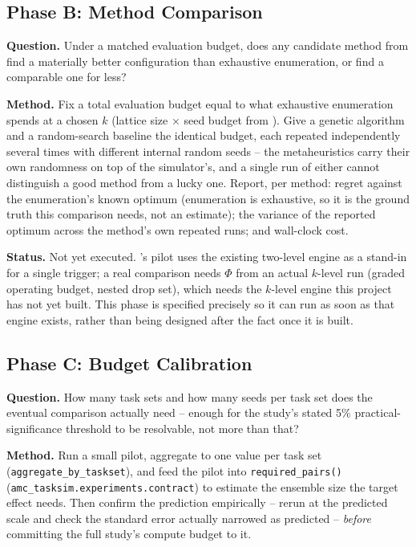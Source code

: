 \documentclass{article}
\begin{document}
\subsection{Phase B: Method Comparison}
\label{sec:phase-b}

\textbf{Question.} Under a matched evaluation budget, does any candidate
method from  find a materially better configuration
than exhaustive enumeration, or find a comparable one for less?

\textbf{Method.} Fix a total evaluation budget equal to what exhaustive
enumeration spends at a chosen $k$ (lattice size $\times$ seed budget from
). Give a genetic algorithm and a random-search baseline
the identical budget, each repeated independently several times with
different internal random seeds -- the metaheuristics carry their own
randomness on top of the simulator's, and a single run of either cannot
distinguish a good method from a lucky one. Report, per method: regret
against the enumeration's known optimum (enumeration is exhaustive, so it is
the ground truth this comparison needs, not an estimate); the variance of the
reported optimum across the method's own repeated runs; and wall-clock cost.

\textbf{Status.} Not yet executed. 's pilot uses the
existing two-level engine as a stand-in for a single trigger; a real
comparison needs $\Phi$ from an actual $k$-level run (graded operating
budget, nested drop set), which needs the $k$-level engine this project has
not yet built. This phase is specified precisely so it can run as soon as
that engine exists, rather than being designed after the fact once it is
built.

\subsection{Phase C: Budget Calibration}
\label{sec:phase-c}

\textbf{Question.} How many task sets and how many seeds per task set does
the eventual comparison actually need -- enough for the study's stated 5\%
practical-significance threshold to be resolvable, not more than that?

\textbf{Method.} Run a small pilot, aggregate to one value per task set
(\texttt{aggregate\_by\_taskset}), and feed the pilot into
\texttt{required\_pairs()} (\texttt{amc\_tasksim.experiments.contract}) to
estimate the ensemble size the target effect needs. Then confirm the
prediction empirically -- rerun at the predicted scale and check the
standard error actually narrowed as predicted -- \emph{before} committing the
full study's compute budget to it.
\end{document}
